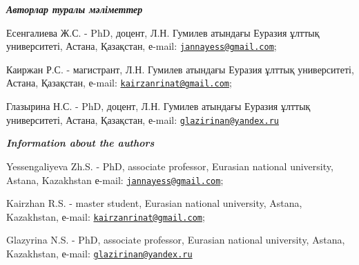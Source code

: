\begin{authorinfo}
\emph{{\bfseries Авторлар туралы мәліметтер}}

Есенгалиева Ж.С. - PhD, доцент, Л.Н. Гумилев атындағы Еуразия ұлттық
университеті, Астана, Қазақстан, е-mail:
\href{mailto:jannayess@gmail.com}{\nolinkurl{jannayess@gmail.com}};

Каиржан Р.С. - магистрант, Л.Н. Гумилев атындағы Еуразия ұлттық
университеті, Астана, Қазақстан, е-mail:
\href{mailto:kairzanrinat@gmail.com}{\nolinkurl{kairzanrinat@gmail.com}};

Глазырина Н.С. - PhD, доцент, Л.Н. Гумилев атындағы Еуразия ұлттық
университеті, Астана, Қазақстан, е-mail:
\href{mailto:glazirinan@yandex.ru}{\nolinkurl{glazirinan@yandex.ru}}

\emph{{\bfseries Information about the authors}}

Yessengaliyeva Zh.S. - PhD, associate professor, Eurasian national
university, Astana, Kazakhstan
е-mail: \href{mailto:jannayess@gmail.com}{\nolinkurl{jannayess@gmail.com}};

Kairzhan R.S. - master student, Eurasian national university, Astana,
Kazakhstan, е-mail:
\href{mailto:kairzanrinat@gmail.com}{\nolinkurl{kairzanrinat@gmail.com}};

Glazyrina N.S. - PhD, associate professor, Eurasian national university,
Astana, Kazakhstan, е-mail:
\href{mailto:glazirinan@yandex.ru}{\nolinkurl{glazirinan@yandex.ru}}\
\end{authorinfo}
